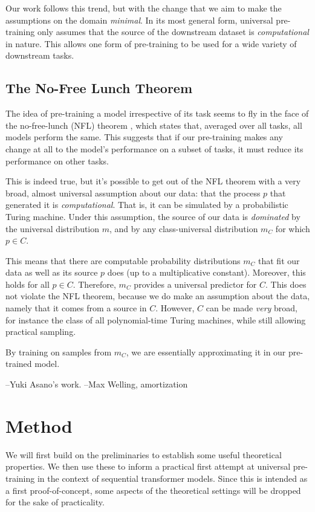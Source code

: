\documentclass{article} %
\begin{document}
Our work follows this trend, but with the change that we aim to make the assumptions on the domain \emph{minimal}. In its most general form, universal pre-training only assumes that the source of the downstream dataset is \emph{computational} in nature. This allows one form of pre-training to be used for a wide variety of downstream tasks.

\subsection{The No-Free Lunch Theorem}

The idea of pre-training a model irrespective of its task seems to fly in the face of the no-free-lunch (NFL) theorem \cite{}, which states that, averaged over all tasks, all models perform the same. This suggests that if our pre-training makes any change at all to the model's performance on a subset of tasks, it must reduce its performance on other tasks.

This is indeed true, but it's possible to get out of the NFL theorem with a very broad, almost universal assumption about our data: that the process $p$ that generated it is \emph{computational}. That is, it can be simulated by a probabilistic Turing machine. Under this assumption, the source of our data is \emph{dominated} by the universal distribution $m$, and by any class-universal distribution $m_C$ for which $p \in C$. 

This means that there are computable probability distributions $m_C$ that fit our data as well as its source $p$ does (up to a multiplicative constant). Moreover, this holds for all $p \in C$. Therefore, $m_C$ provides a universal predictor for $C$. This does not violate the NFL theorem, because we do make an assumption about the data, namely that it comes from a source in $C$. However, $C$ can be made \emph{very} broad, for instance the class of all polynomial-time Turing machines, while still allowing practical sampling.

By training on samples from $m_C$, we are essentially approximating it in our pre-trained model.\footnotemark

--Yuki Asano's work.
--Max Welling, amortization

\section{Method}

We will first build on the preliminaries to establish some useful theoretical properties. We then use these to inform a practical first attempt at universal pre-training in the context of sequential transformer models. Since this is intended as a first proof-of-concept, some aspects of the theoretical settings will be dropped for the sake of practicality.
\end{document}
